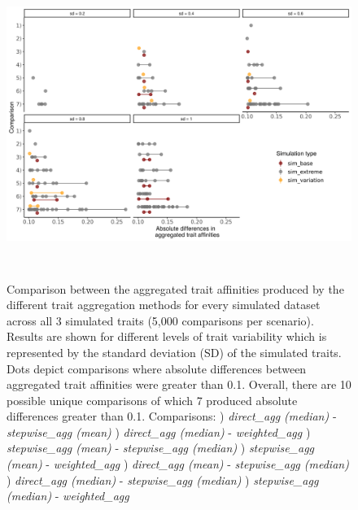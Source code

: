 \documentclass[12pt]{article}
\begin{document}
\begin{figure}[H]
  \centering
  \includegraphics[width=16.5cm, height=10cm]{Diffs_indiv_runs_sim.png}
  \caption{Comparison between the aggregated trait affinities produced by the different trait aggregation methods for every simulated dataset across all 3 simulated traits (5,000 comparisons per scenario). Results are shown for different levels of trait variability which is represented by the standard deviation (SD) of the simulated traits. Dots depict comparisons where absolute differences between aggregated trait affinities were greater than 0.1. Overall, there are 10 possible unique comparisons of which 7 produced absolute differences greater than 0.1. \newline
  Comparisons: ) \textit{direct\_agg (median)} - \textit{stepwise\_agg (mean)} ) \textit{direct\_agg (median)} - \textit{weighted\_agg} ) \textit{stepwise\_agg (mean)} - \textit{stepwise\_agg (median)} ) \textit{stepwise\_agg (mean)} - \textit{weighted\_agg} ) \textit{direct\_agg (mean)} - \textit{stepwise\_agg (median)} ) \textit{direct\_agg (median)} - \textit{stepwise\_agg (median)} ) \textit{stepwise\_agg (median)} - \textit{weighted\_agg} \newline
  }
  \label{fig:sim_indv_runs}
\end{figure}
\end{document}
